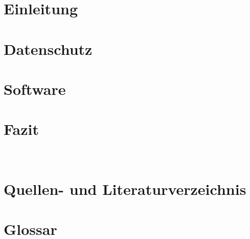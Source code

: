 \documentclass[11pt]{article}
\begin{document}
    
    \newpage
    \tableofcontents
    \thispagestyle{empty}
    \newpage
    \section{Einleitung}
    
    \pagebreak
    \section{Datenschutz}
    
    \pagebreak
    \section{Software}
    
    \pagebreak
    \section{Fazit}
    \\
    \clearpage
    \pagestyle{plain}
    \section{Quellen- und Literaturverzeichnis}
    
    \pagebreak
    \section{Glossar}
    
    \pagebreak
    
\end{document}
